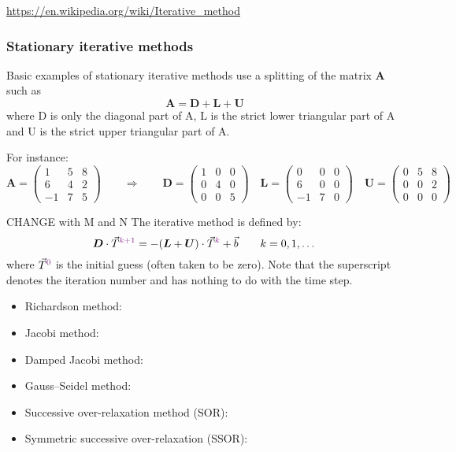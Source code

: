 
\url{https://en.wikipedia.org/wiki/Iterative_method}

\subsubsection{Stationary iterative methods}

Basic examples of stationary iterative methods use a splitting of the matrix ${\bm A}$ such as
\[
{\bm A}={\bm D}+{\bm L}+{\bm U}
\]
where D is only the diagonal part of A, L is the strict lower triangular part of A and
U is the strict upper triangular part of A.

For instance:
\[
{\bm A}=
\left(
\begin{array}{ccc}
1 & 5 & 8 \\
6 & 4 & 2 \\
-1 & 7 & 5
\end{array}
\right)
\qquad
\Rightarrow
\qquad
{\bm D}=
\left(
\begin{array}{ccc}
1 & 0 & 0 \\
0 & 4 & 0 \\
0 & 0 & 5
\end{array}
\right)
\quad
{\bm L}=
\left(
\begin{array}{ccc}
0 & 0 & 0 \\
6 & 0 & 0 \\
-1 & 7 & 0
\end{array}
\right)
\quad
{\bm U}=
\left(
\begin{array}{ccc}
0 & 5 & 8 \\
0 & 0 & 2 \\
0 & 0 & 0
\end{array}
\right)
\]


CHANGE with M and N
The iterative method is defined by:
\begin{equation}
{\bm D} \cdot \vec{T}^{{\color{Fuchsia}k+1}} = -({\bm L} + {\bm U}) \cdot \vec{T}^{\color{Fuchsia}k} 
+ \vec{b}
\qquad k=0,1,\dots
\end{equation}
where $\vec{T}^{\color{Fuchsia}0}$ is the initial guess (often taken to be zero).
Note that the superscript denotes the iteration number and has nothing to 
do with the time step.


\begin{itemize}
\item Richardson method: 
\item Jacobi method: 
\item Damped Jacobi method: 
\item Gauss–Seidel method: 
\item Successive over-relaxation method (SOR):
\item Symmetric successive over-relaxation (SSOR):
\end{itemize}

